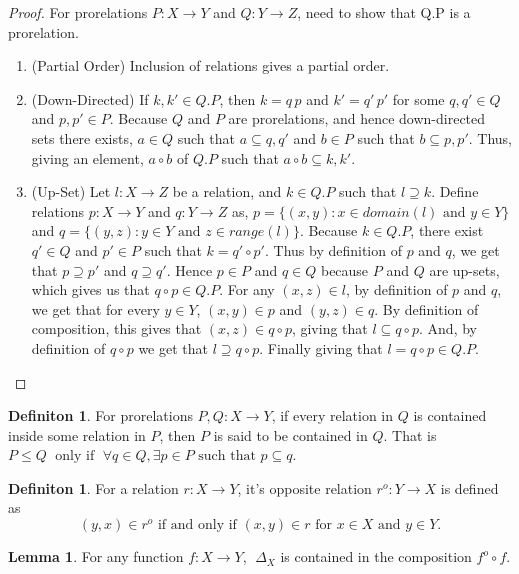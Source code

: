 \documentclass[18pt,a4paper]{article}
\theoremstyle{definition}
\newtheorem{definition}[theorem]{Definiton}
\newtheorem{lemma}[theorem]{Lemma}
\begin{document}
\begin{proof}
	For prorelations $P:X \to Y$ and $Q:Y \to Z$, need to show that Q.P is a prorelation.
	\begin{enumerate}[label=(\roman*)]
		\item (Partial Order) Inclusion of relations gives a partial order.
		\item (Down-Directed) If $k,k' \in Q.P$, then $k=q\,p$ and $k'=q'\,p'$ for some
		$q,q' \in Q$ and $p,p' \in P$. Because $Q$ and $P$ are prorelations,
		and hence down-directed sets there exists, $a \in Q$ such that
		$ a\subseteq q,q'$ and $b \in P$ such that $b \subseteq p,p'$. Thus,
		giving an element, $a\circ b$ of $Q.P$ such that $a \circ b \subseteq k, k'$.
	\item (Up-Set) Let $l:X \to Z$ be a relation, and $k \in Q.P$ such that $l \supseteq k$.
		Define relations $ p:X \to Y $ and $q:Y \to Z$ as,
		$p=\{(x,y): x \in domain(l) \text{ and } y \in Y\}$ and
		$q=\{(y,z):  y \in Y \text{ and } z \in range(l)\}$.
		Because $k\in Q.P$, there exist $q'\in Q$ and $p' \in P$ such that
		$k = q' \circ p'$. Thus by definition of $p$ and $q$, we get that
		$p \supseteq p'$ and $q \supseteq q'$. Hence $p \in P$ and $q \in Q$ because
		$P$ and $Q$ are up-sets, which gives us that $q\circ p \in Q.P$.
		For any $(x,z) \in l$, by definition
		of $p$ and $q$, we get that for every $y \in Y$, $(x,y) \in p$ and
		$(y,z) \in q $. By
		definition of composition, this gives that $(x,z) \in q \circ p$,
		giving that $l \subseteq q \circ p$. And, by definition
		of $q \circ p$ we get that $l \supseteq q \circ p$. Finally giving that
		$l=q \circ p \in Q.P$.
	\end{enumerate}
\end{proof}
\begin{definition} %
	For prorelations $P,Q:X\to Y$, if every relation in $Q$ is contained inside some
	relation in $P$, then $P$ is said to be contained in $Q$.
	That is $P \leq Q \;\text{ only if }\;
	\forall q \in Q, \exists p \in P \text{ such that } p \subseteq q$.
\end{definition}
\begin{definition} %
	For a relation $r:X \to Y$, it's opposite relation $r^o:Y \to X$ is defined as
	\[ (y,x) \in r^o \text{ if and only if } (x,y)\in r  \text{ for } x\in X \text{ and }
	y \in Y.\]
\end{definition}
\begin{lemma}
	For any function $f:X \to Y$, $\; \Delta_X$ is contained in the composition $ f^o \circ f$.
\end{lemma}
\end{document}
